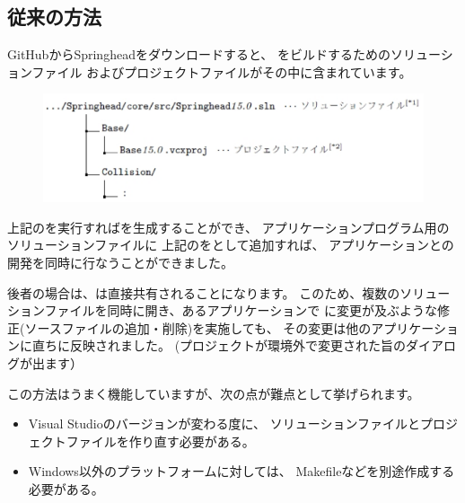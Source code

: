 \subsection{従来の方法}
\label{subsec:ConventionalMethod}

\noindent
GitHubからSpringheadをダウンロードすると、
\SprLib をビルドするためのソリューションファイル
およびプロジェクトファイルがその中に含まれています。

\medskip
\ifLwarp
{}
\begin{narrow}[15pt]
	\begin{figure}[h]
	    \begin{center}
	    \includegraphics[width=.9\textwidth]{fig/DownloadTree.eps}
	    \end{center}
	    \label{fig:DownloadTree}
	\end{figure}
\end{narrow}
\else
\begin{narrow}
    \begin{narrow}[20pt]\begin{minipage}{\textwidth}
	{\footnotesize{}}
	\medskip
  \end{minipage}\end{narrow}
\end{narrow}
\fi

\noindent
上記の\SolutionFile を実行すれば\SprLib を生成することができ、
アプリケーションプログラム用のソリューションファイルに
上記の\ProjectFile をとして追加すれば、
アプリケーションと\SprLib の開発を同時に行なうことができました。

後者の場合は、\ProjectFile は直接共有されることになります。
このため、複数のソリューションファイルを同時に開き、あるアプリケーションで
\ProjectFile に変更が及ぶような修正(ソースファイルの追加・削除)を実施しても、
その変更は他のアプリケーションに直ちに反映されました。
(プロジェクトが環境外で変更された旨のダイアログが出ます）

\medskip
\noindent
この方法はうまく機能していますが、次の点が難点として挙げられます。

\begin{itemize}
  \item	Visual Studioのバージョンが変わる度に、
	ソリューションファイルとプロジェクトファイルを作り直す必要がある。
  \item	Windows以外のプラットフォームに対しては、
	Makefileなどを別途作成する必要がある。
\end{itemize}

